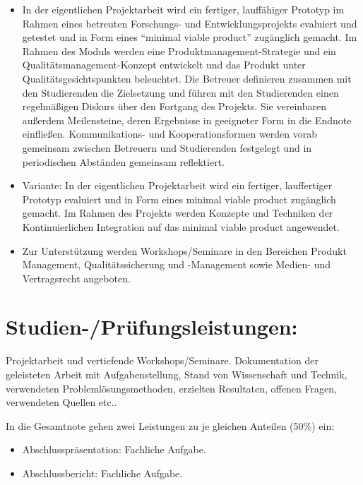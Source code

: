 \begin{itemize}
\tightlist
\item
  In der eigentlichen Projektarbeit wird ein fertiger, lauffähiger
  Prototyp im Rahmen eines betreuten Forschungs- und
  Entwicklungsprojekts evaluiert und getestet und in Form eines
  ``minimal viable product'' zugänglich gemacht. Im Rahmen des Moduls
  werden eine Produktmanagement-Strategie und ein
  Qualitätsmanagement-Konzept entwickelt und das Produkt unter
  Qualitätsgesichtspunkten beleuchtet. Die Betreuer definieren zusammen
  mit den Studierenden die Zielsetzung und führen mit den Studierenden
  einen regelmäßigen Diskurs über den Fortgang des Projekts. Sie
  vereinbaren außerdem Meilensteine, deren Ergebnisse in geeigneter Form
  in die Endnote einfließen. Kommunikations- und Kooperationsformen
  werden vorab gemeinsam zwischen Betreuern und Studierenden festgelegt
  und in periodischen Abständen gemeinsam reflektiert.
\item
  Variante: In der eigentlichen Projektarbeit wird ein fertiger,
  lauffertiger Prototyp evaluiert und in Form eines minimal viable
  product zugänglich gemacht. Im Rahmen des Projekts werden Konzepte und
  Techniken der Kontinuierlichen Integration auf das minimal viable
  product angewendet.
\item
  Zur Unterstützung werden Workshops/Seminare in den Bereichen Produkt
  Management, Qualitätssicherung und -Management sowie Medien- und
  Vertragsrecht angeboten.
\end{itemize}

\section*{Studien-/Prüfungsleistungen:}\label{studien-pruxfcfungsleistungen-9}

Projektarbeit und vertiefende Workshops/Seminare. Dokumentation der
geleisteten Arbeit mit Aufgabenstellung, Stand von Wissenschaft und
Technik, verwendeten Problemlösungsmethoden, erzielten Resultaten,
offenen Fragen, verwendeten Quellen etc..

In die Gesamtnote gehen zwei Leistungen zu je gleichen Anteilen (50\%)
ein:

\begin{itemize}
\tightlist
\item
  Abschlusspräsentation: Fachliche Aufgabe.
\item
  Abschlussbericht: Fachliche Aufgabe.
\end{itemize}


